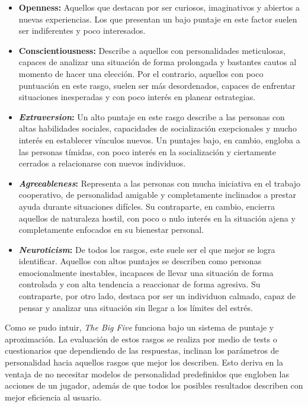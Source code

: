 \documentclass[conference]{IEEEtran}
\begin{document}
\begin{itemize}
\item \textbf{Openness: } Aquellos que destacan  por ser curiosos, imaginativos y abiertos a nuevas experiencias. Los que presentan un bajo puntaje en este factor suelen ser indiferentes y poco interesados.

\item \textbf{Conscientiousness: } Describe a aquellos con personalidades meticulosas, capaces de analizar una situación de forma prolongada y bastantes  cautos al momento de hacer una elección. Por el contrario, aquellos con poco puntuación en este rasgo, suelen ser más desordenados, capaces de enfrentar situaciones inesperadas y con poco interés en planear estrategias.

\item \textbf{\textit{Extraversion}: } Un alto puntaje en este rasgo describe a las personas con altas habilidades sociales, capacidades de socialización exepcionales y mucho interés en establecer vínculos nuevos. Un puntajes bajo, en cambio, engloba a  las personas tímidas, con poco interés en la socialización y ciertamente cerrados a relacionarse con nuevos individuos. 

\item \textbf{\textit{Agreeableness}: } Representa a las personas con mucha iniciativa en el trabajo cooperativo, de personalidad amigable y completamente inclinados a prestar ayuda durante situaciones difícles.  Su contraparte, en cambio, encierra aquellos de naturaleza hostil, con poco o nulo interés en la situación ajena y completamente enfocados en su bienestar personal. 

\item \textbf{\textit{Neuroticism}: } De todos los rasgos, este suele ser el que mejor se logra identificar. Aquellos con altos puntajes se describen como personas  emocionalmente inestables, incapaces de llevar una situación de forma controlada y con alta tendencia a reaccionar de forma agresiva. Su contraparte, por otro lado, destaca por ser un individuon calmado, capaz de pensar y analizar una situación sin llegar a los límites del estrés.

\end{itemize}

Como se pudo intuir, \textit{The Big Five} funciona bajo un sistema de puntaje y aproximación. La evaluación de estos rasgos se realiza por medio de tests o cuestionarios que dependiendo de las respuestas, inclinan los parámetros de personalidad hacia aquellos rasgos que mejor los describen.  Esto deriva en la ventaja de no necesitar modelos de personalidad predefinidos que engloben las acciones de un jugador, además de que todos los posibles resultados describen con mejor eficiencia al usuario.
\end{document}

